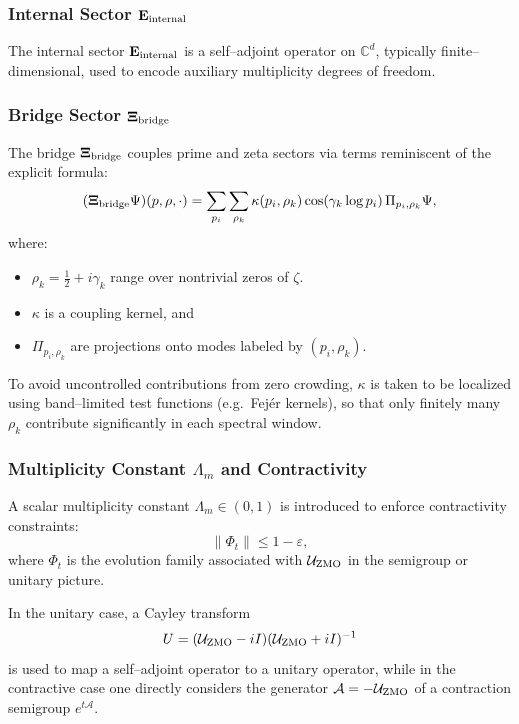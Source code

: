 \documentclass[11pt]{article}
\begin{document}
\subsubsection{Internal Sector \(\mathbf{E}_{\rm internal}\)}

The internal sector \(\mathbf{E}_{\rm internal}\) is a self–adjoint operator on \(\mathbb{C}^d\), typically finite–dimensional, used to encode auxiliary multiplicity degrees of freedom.

\subsubsection{Bridge Sector \(\mathbf{\Xi}_{\rm bridge}\)}

The bridge \(\mathbf{\Xi}_{\rm bridge}\) couples prime and zeta sectors via terms reminiscent of the explicit formula:
\begin{equation}
  (\mathbf{\Xi}_{\rm bridge} \Psi)(p,\rho,\cdot)
  = \sum_{p_i} \sum_{\rho_k} \kappa(p_i,\rho_k) \cos(\gamma_k \log p_i) \,\Pi_{p_i, \rho_k}\Psi,
\end{equation}
where:
\begin{itemize}
  \item \(\rho_k = \tfrac12 + i\gamma_k\) range over nontrivial zeros of \(\zeta\).\cite{RHOverview}
  \item \(\kappa\) is a coupling kernel, and
  \item \(\Pi_{p_i,\rho_k}\) are projections onto modes labeled by \((p_i,\rho_k)\).
\end{itemize}
To avoid uncontrolled contributions from zero crowding, \(\kappa\) is taken to be localized using band–limited test functions (e.g.\ Fejér kernels), so that only finitely many \(\rho_k\) contribute significantly in each spectral window.\cite{RZQC}

\subsubsection{Multiplicity Constant \(\Lambda_m\) and Contractivity}

A scalar multiplicity constant \(\Lambda_m \in (0,1)\) is introduced to enforce contractivity constraints:
\begin{equation}
  \|\Phi_t\| \leq 1 - \varepsilon,
\end{equation}
where \(\Phi_t\) is the evolution family associated with \(\mathcal{U}_{\rm ZMO}\) in the semigroup or unitary picture.

In the unitary case, a Cayley transform
\begin{equation}
  U = (\mathcal{U}_{\rm ZMO} - iI)(\mathcal{U}_{\rm ZMO} + iI)^{-1}
\end{equation}
is used to map a self–adjoint operator to a unitary operator, while in the contractive case one directly considers the generator \(\mathcal{A} = -\mathcal{U}_{\rm ZMO}\) of a contraction semigroup \(e^{t\mathcal{A}}\).
\end{document}
